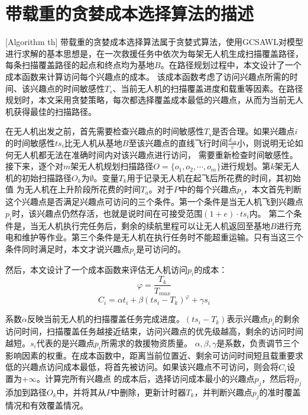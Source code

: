 \section{带载重的贪婪成本选择算法的描述}[Algorithm th]
带载重的贪婪成本选择算法属于贪婪式算法，使用GCSAWL对模型进行求解的基本思想是，在一次救援任务中依次为每架无人机生成扫描覆盖路径，每条扫描覆盖路径的起点和终点均为基地$B$。在路径规划过程中，本文设计了一个成本函数来计算访问每个兴趣点的成本。
该成本函数考虑了访问兴趣点所需的时间、该兴趣点的时间敏感性$T_s$、当前无人机的扫描覆盖进度和载重等因素。在路径规划时，本文采用贪婪策略，每次都选择覆盖成本最低的兴趣点，从而为当前无人机获得最佳的扫描路径。


在无人机出发之前，首先需要检查兴趣点的时间敏感性$T_s$是否合理。如果兴趣点$i$的时间敏感性$ts_i$比无人机从基地$B$至该兴趣点的直线飞行时间$\frac{d_{iB}}{v}$小，则说明无论如何无人机都无法在准确时间内对该兴趣点进行访问，
需要重新检查时间敏感性。接下来，逐个对$m$架无人机规划扫描路径$O=\lbrace o_1, o_2, \cdots ,o_m \rbrace$进行规划。第$k$架无人机的初始扫描路径$O_k$为$\emptyset$。变量$T_k$用于记录无人机在起飞后所花费的时间，其初始值
为无人机在上升阶段所花费的时间$T_a$。对于$P$中的每个兴趣点$p_i$，本文首先判断这个兴趣点是否满足兴趣点可访问的三个条件。第一个条件是当无人机飞到兴趣点$p_i$时，该兴趣点仍然存活，也就是说时间在可接受范围$(1+e) \cdot ts_i$内。
第二个条件是，当无人机执行完任务后，剩余的续航里程可以让无人机返回至基地$B$进行充电和维护等作业。第三个条件是无人机在执行任务时不能超重运输。只有当这三个条件同时满足时，本文才说兴趣点$p_i$是可访问的。


然后，本文设计了一个成本函数来评估无人机访问$p_i$的成本：
\begin{equation}
	\varphi = \frac{T_k}{T_{max}}
\end{equation}
\begin{equation}
	C_i = \alpha t_i + \beta (ts_i - T_k)^\varphi + \gamma s_i
\end{equation}

系数$\alpha$反映当前无人机的扫描覆盖任务完成进度。$(ts_i - T_k)$表示兴趣点$p_i$的剩余访问时间，扫描覆盖任务越接近结束，访问兴趣点的优先级越高，剩余的访问时间越短。$s_i$代表的是兴趣点$p_i$所需求的救援物资质量。
$\alpha,\beta,\gamma$是系数，负责调节三个影响因素的权重。在成本函数中，距离当前位置近、剩余可访问时间短且载重要求低的兴趣点访问成本最低，将首先被访问。如果该兴趣点不可访问，则会将$C_i$设置为$+\infty$。计算完所有兴趣点
的成本后，选择访问成本最小的兴趣点$p_j$，然后将$p_j$添加到路径$O_k$中，并将其从$P$中删除，更新计时器$T_k$，并判断兴趣点$p_j$的准时覆盖情况和有效覆盖情况。



